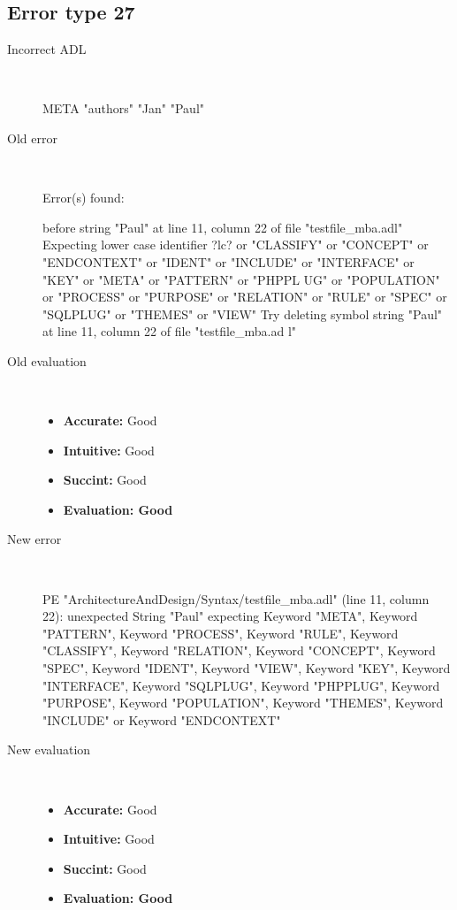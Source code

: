 \hrulefill

\subsection{Error type 27}
  \begin{description}
  \item[Incorrect ADL]~\\
\begin{adl}
META "authors" "Jan" "Paul"\end{adl}
  \item[Old error]~\\
\begin{haskell}
Error(s) found:

before string "Paul" at line 11, column 22 of file "testfile_mba.adl"
Expecting lower case identifier ?lc? or "CLASSIFY" or "CONCEPT" or "ENDCONTEXT"
or "IDENT" or "INCLUDE" or "INTERFACE" or "KEY" or "META" or "PATTERN" or "PHPPL
UG" or "POPULATION" or "PROCESS" or "PURPOSE" or "RELATION" or "RULE" or "SPEC"
or "SQLPLUG" or "THEMES" or "VIEW"
Try deleting symbol string "Paul" at line 11, column 22 of file "testfile_mba.ad
l"

\end{haskell}
  \item[Old evaluation]~\\
    \begin{itemize}
    \item \textbf{Accurate:} Good
    \item \textbf{Intuitive:} Good
    \item \textbf{Succint:} Good
    \item \textbf{Evaluation: Good}
    \end{itemize}
  \item[New error]~\\
\begin{haskell}
PE "ArchitectureAndDesign/Syntax/testfile_mba.adl" (line 11, column 22):
unexpected String "Paul"
expecting Keyword "META", Keyword "PATTERN", Keyword "PROCESS", Keyword "RULE", Keyword "CLASSIFY", Keyword "RELATION", Keyword "CONCEPT", Keyword "SPEC", Keyword "IDENT", Keyword "VIEW", Keyword "KEY", Keyword "INTERFACE", Keyword "SQLPLUG", Keyword "PHPPLUG", Keyword "PURPOSE", Keyword "POPULATION", Keyword "THEMES", Keyword "INCLUDE" or Keyword "ENDCONTEXT"
\end{haskell}
  \item[New evaluation]~\\
    \begin{itemize}
    \item \textbf{Accurate:} Good
    \item \textbf{Intuitive:} Good
    \item \textbf{Succint:} Good
    \item \textbf{Evaluation: Good
}
    \end{itemize}
  \end{description}

